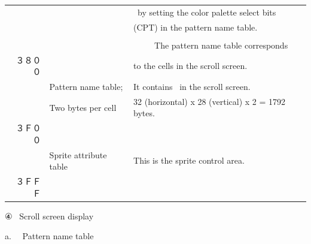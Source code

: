 \documentclass[a4paper,10pt]{article}
\begin{document}
\begin{tabular}{r|l|l}
& & \ by setting the color palette select bits\\[-1.2em]
& & (CPT) in the pattern name table.\\[-1.2em]
& &\\[-1.2em]
& & \ \ \ \ \ The pattern name table corresponds\\[-1.2em]
３８００ & & to the cells in the scroll screen.\\[-1.2em]
\cline{2-2}
& Pattern name table; & It contains \ in the scroll screen.\\[-1.2em]
& Two bytes per cell & 32 (horizontal) x 28 (vertical) x 2 = 1792 bytes.\\[-1.2em]
３Ｆ００ & &\\[-1.2em]
\cline{2-2}
& Sprite attribute table & This is the sprite control area.\\[-1.2em]
３ＦＦＦ & &\\[-1.2em]
\cline{2-2}
\end{tabular}

\newpage

{}

\noindent ④ \ Scroll screen display

{}

\noindent a. \ \ Pattern name table
\end{document}
